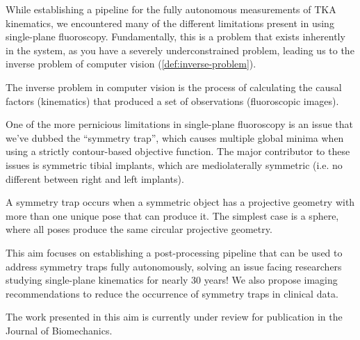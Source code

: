 While establishing a pipeline for the fully autonomous measurements of TKA kinematics, we encountered many of the different limitations present in using single-plane fluoroscopy. Fundamentally, this is a problem that exists inherently in the system, as you have a severely underconstrained problem, leading us to the inverse problem of computer vision (\cref{def:inverse-problem}).

\begin{mdframed}
	\begin{definition}
		The inverse problem in computer vision is the process of calculating the causal factors (kinematics) that produced a set of observations (fluoroscopic images).
		\label{def:inverse-problem}
	\end{definition}
\end{mdframed}

One of the more pernicious limitations in single-plane fluoroscopy is an issue that we've dubbed the ``symmetry trap'', which causes multiple global minima when using a strictly contour-based objective function. The major contributor to these issues is symmetric tibial implants, which are mediolaterally symmetric (i.e. no different between right and left implants).

\begin{mdframed}
	\begin{definition}
		A symmetry trap occurs when a symmetric object has a projective geometry with more than one unique pose that can produce it. The simplest case is a sphere, where all poses produce the same circular projective geometry.
	\end{definition}
\end{mdframed}

This aim focuses on establishing a post-processing pipeline that can be used to address symmetry traps fully autonomously, solving an issue facing researchers studying single-plane kinematics for nearly 30 years! We also propose imaging recommendations to reduce the occurrence of symmetry traps in clinical data.

The work presented in this aim is currently under review for publication in the Journal of Biomechanics.


